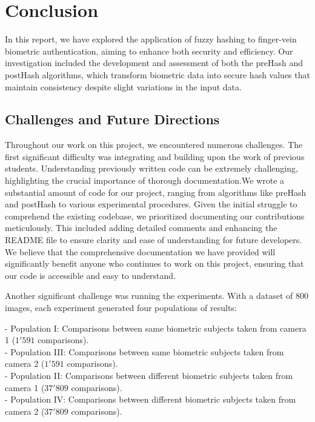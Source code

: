 \newpage

\section{Conclusion}
In this report, we have explored the application of fuzzy hashing to finger-vein biometric authentication, aiming to enhance both security and efficiency. Our investigation included the development and assessment of both the preHash and postHash algorithms, which transform biometric data into secure hash values that maintain consistency despite slight variations in the input data.

\subsection{Challenges and Future Directions}
Throughout our work on this project, we encountered numerous challenges. The first significant difficulty was integrating and building upon the work of previous students. Understanding previously written code can be extremely challenging, highlighting the crucial importance of thorough documentation.We wrote a substantial amount of code for our project, ranging from algorithms like preHash and postHash to various experimental procedures. Given the initial struggle to comprehend the existing codebase, we prioritized documenting our contributions meticulously. This included adding detailed comments and enhancing the README file to ensure clarity and ease of understanding for future developers. We believe that the comprehensive documentation we have provided will significantly benefit anyone who continues to work on this project, ensuring that our code is accessible and easy to understand.

Another significant challenge was running the experiments. With a dataset of 800 images, each experiment generated four populations of results:

- Population I: Comparisons between same biometric subjects taken from camera 1 (\(1'591\) comparisons).\\
- Population III: Comparisons between same biometric subjects taken from camera 2 (\(1'591\) comparisons).\\
- Population II: Comparisons between different biometric subjects taken from camera 1 (\(37'809\) comparisons).\\
- Population IV: Comparisons between different biometric subjects taken from camera 2 (\(37'809\) comparisons).

